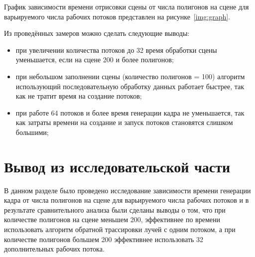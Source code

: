 График зависимости времени отрисовки сцены от числа полигонов на сцене для варьируемого числа рабочих потоков представлен на рисунке~\ref{img:graph}.

\FloatBarrier
{}
\FloatBarrier

Из проведённых замеров можно сделать следующие выводы:
\begin{itemize}
	\item {при увеличении количества потоков до 32 время обработки сцены уменьшается, если на сцене 200 и более полигонов;}
	\item {при небольшом заполнении сцены (количество полигонов = 100) алгоритм использующий последовательную обработку данных работает быстрее, так как не тратит время на создание потоков;}
	\item {при работе 64 потоков и более время генерации кадра не уменьшается, так как затраты времени на создание и запуск потоков становятся слишком большими;}
\end{itemize}


\section{Вывод из исследовательской части}
В данном разделе было проведено исследование зависимости времени генерации кадра от числа полигонов на сцене для варьируемого числа рабочих потоков и в результате сравнительного анализа были сделаны выводы о том, что при количестве полигонов на сцене меньшем 200, эффективнее по времени использовать алгоритм обратной трассировки лучей с одним потоком, а при  количестве полигонов большем 200 эффективнее использовать 32 дополнительных рабочих потока.


\clearpage

